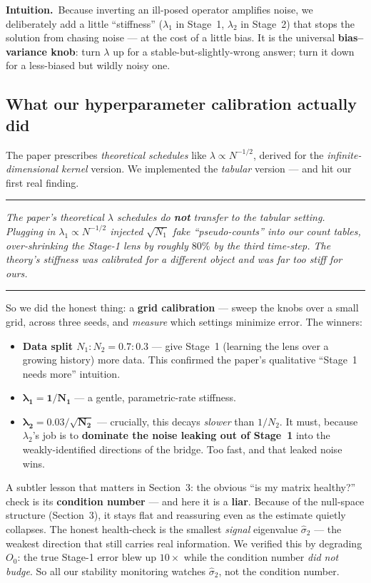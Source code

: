 \documentclass[11pt]{article}
\newenvironment{takeaway}
  {\par\vspace{4pt}\noindent\begin{center}\begin{minipage}{0.94\linewidth}%
   \color{black!88}\rule{\linewidth}{0.7pt}\par\vspace{3pt}\small\itshape}
  {\par\vspace{3pt}\rule{\linewidth}{0.7pt}\end{minipage}\end{center}\vspace{4pt}}
\newcommand{\intuition}[1]{\vspace{2pt}\noindent\textbf{Intuition.}\ #1\par\vspace{2pt}}
\newcommand{\Ob}{O_0}
\begin{document}
\intuition{Because inverting an ill-posed operator amplifies noise, we deliberately
add a little ``stiffness'' ($\lambda_1$ in Stage~1, $\lambda_2$ in Stage~2) that
stops the solution from chasing noise --- at the cost of a little bias. It is the
universal \textbf{bias--variance knob}: turn $\lambda$ up for a stable-but-slightly-wrong
answer; turn it down for a less-biased but wildly noisy one.}

\subsection{What our hyperparameter calibration actually did}
The paper prescribes \emph{theoretical schedules} like $\lambda\propto N^{-1/2}$,
derived for the \emph{infinite-dimensional kernel} version. We implemented the
\emph{tabular} version --- and hit our first real finding.

\begin{takeaway}
The paper's theoretical $\lambda$ schedules do \textbf{not} transfer to the tabular
setting. Plugging in $\lambda_1\propto N^{-1/2}$ injected $\sqrt{N_1}$ fake
``pseudo-counts'' into our count tables, over-shrinking the Stage-1 lens by roughly
$80\%$ by the third time-step. The theory's stiffness was calibrated for a different
object and was far too stiff for ours.
\end{takeaway}

So we did the honest thing: a \textbf{grid calibration} --- sweep the knobs over a
small grid, across three seeds, and \emph{measure} which settings minimize error. The
winners:
\begin{itemize}
  \item \textbf{Data split $N_1:N_2 = 0.7:0.3$} --- give Stage~1 (learning the lens
  over a growing history) more data. This confirmed the paper's qualitative ``Stage~1
  needs more'' intuition.
  \item $\boldsymbol{\lambda_1 = 1/N_1}$ --- a gentle, parametric-rate stiffness.
  \item $\boldsymbol{\lambda_2 = 0.03/\sqrt{N_2}}$ --- crucially, this decays
  \emph{slower} than $1/N_2$. It must, because $\lambda_2$'s job is to
  \textbf{dominate the noise leaking out of Stage~1} into the weakly-identified
  directions of the bridge. Too fast, and that leaked noise wins.
\end{itemize}
A subtler lesson that matters in Section~3: the obvious ``is my matrix healthy?''
check is its \textbf{condition number} --- and here it is a \textbf{liar}. Because of
the null-space structure (Section~3), it stays flat and reassuring even as the
estimate quietly collapses. The honest health-check is the smallest \emph{signal}
eigenvalue $\hat\sigma_2$ --- the weakest direction that still carries real
information. We verified this by degrading $\Ob$: the true Stage-1 error blew up
$10\times$ while the condition number \emph{did not budge}. So all our stability
monitoring watches $\hat\sigma_2$, not the condition number.
\end{document}
